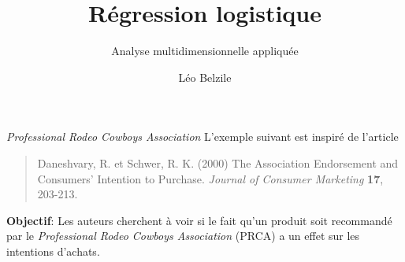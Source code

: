 \documentclass[
  ignorenonframetext,
]{beamer}
\title{Régression logistique}
\subtitle{Analyse multidimensionnelle appliquée}
\author{Léo Belzile}
\date{}
\institute{HEC Montréal}
\begin{document}
\frame{\titlepage}
\ifdefined\Shaded\renewenvironment{Shaded}{\begin{tcolorbox}[frame hidden, borderline west={3pt}{0pt}{shadecolor}, enhanced, boxrule=0pt, breakable, sharp corners, interior hidden]}{\end{tcolorbox}}\fi

\begin{frame}{\emph{Professional Rodeo Cowboys Association}}
\protect\hypertarget{cowboy}{}
L'exemple suivant est inspiré de l'article

\begin{quote}
Daneshvary, R. et Schwer, R. K. (2000) The Association Endorsement and
Consumers' Intention to Purchase. \emph{Journal of Consumer Marketing}
\textbf{17}, 203-213.
\end{quote}

\textbf{Objectif}: Les auteurs cherchent à voir si le fait qu'un produit
soit recommandé par le \emph{Professional Rodeo Cowboys Association}
(PRCA) a un effet sur les intentions d'achats.
\end{frame}
\end{document}
